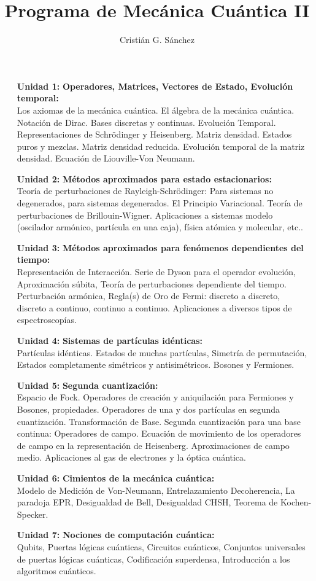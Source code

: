 \documentclass{article}[a4paper,10pt]
\title{Programa de Mecánica Cuántica II}
\author{Cristián G. Sánchez}
\begin{document}
\maketitle

\begin{enumerate}
    \item[ {\bf Unidad 1:}] {\bf Operadores, Matrices, Vectores de Estado, Evolución temporal:\\} Los axiomas de la mecánica cuántica. El álgebra de la mecánica cuántica. Notación de Dirac. Bases discretas y continuas. Evolución  Temporal. Representaciones de Schrödinger y Heisenberg. Matriz densidad. Estados puros y mezclas. Matriz densidad reducida. Evolución temporal de la matriz densidad. Ecuación de Liouville-Von Neumann. 
    \item [{\bf Unidad 2:}] {\bf Métodos aproximados para estado estacionarios:\\} Teoría de perturbaciones de Rayleigh-Schrödinger: Para sistemas no degenerados, para sistemas degenerados. El Principio Variacional. Teoría de perturbaciones de Brillouin-Wigner. Aplicaciones a sistemas modelo (oscilador armónico, partícula en una caja), física  
    atómica y molecular, etc..
    \item [{\bf Unidad 3:}] {\bf Métodos aproximados para fenómenos dependientes del tiempo:\\} Representación de Interacción. Serie de Dyson para el operador evolución, Aproximación súbita, Teoría de perturbaciones dependiente del tiempo. Perturbación armónica, Regla(s) de Oro de Fermi: discreto a discreto, discreto a continuo, continuo a continuo. Aplicaciones a diversos tipos de espectroscopías.
    \item [{\bf Unidad 4:}] {\bf Sistemas de partículas idénticas:\\} Partículas idénticas. Estados de muchas partículas, Simetría de permutación, Estados completamente simétricos y antisimétricos. Bosones y Fermiones.
    \item [{\bf Unidad 5:}] {\bf Segunda cuantización:\\} Espacio de Fock. Operadores de creación y aniquilación para Fermiones y Bosones, propiedades. Operadores de una y dos partículas en segunda cuantización. Transformación de Base. Segunda cuantización para una base continua: Operadores de campo. Ecuación de movimiento de los operadores de campo en la representación de Heisenberg. Aproximaciones de campo medio. Aplicaciones al gas de electrones y la óptica cuántica. 
    \item [{\bf Unidad 6:}] {\bf Cimientos de la mecánica cuántica:\\} Modelo de Medición de Von-Neumann, Entrelazamiento Decoherencia, La paradoja EPR, Desigualdad de Bell, Desigualdad CHSH, Teorema de Kochen-Specker.  
    \item [{\bf Unidad 7:}] {\bf Nociones de computación cuántica:\\} Qubits, Puertas lógicas cuánticas, Circuitos cuánticos, Conjuntos universales de puertas lógicas cuánticas, Codificación superdensa, Introducción a los algoritmos cuánticos. 
\end{enumerate}
\end{document}
